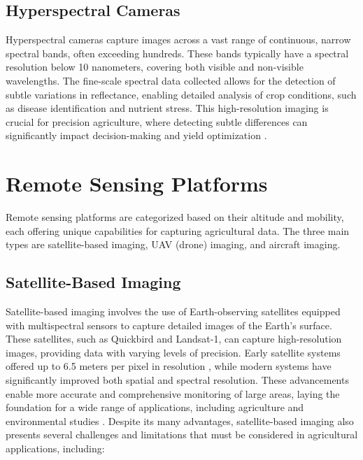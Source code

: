 \subsection{Hyperspectral Cameras}
Hyperspectral cameras capture images across a vast range of continuous, narrow spectral bands, often exceeding hundreds. These bands typically have a spectral resolution below 10 nanometers, covering both visible and non-visible wavelengths. The fine-scale spectral data collected allows for the detection of subtle variations in reflectance, enabling detailed analysis of crop conditions, such as disease identification and nutrient stress. This high-resolution imaging is crucial for precision agriculture, where detecting subtle differences can significantly impact decision-making and yield optimization \parencite{delavarpour2021technical} \parencite{lu2020recent}.

\section{Remote Sensing Platforms}
Remote sensing platforms are categorized based on their altitude and mobility, each offering unique capabilities for capturing agricultural data. The three main types are satellite-based imaging, UAV (drone) imaging, and aircraft imaging.

\subsection{Satellite-Based Imaging}
Satellite-based imaging involves the use of Earth-observing satellites equipped with multispectral sensors to capture detailed images of the Earth's surface. These satellites, such as Quickbird and Landsat-1, can capture high-resolution images, providing data with varying levels of precision. Early satellite systems offered up to 6.5 meters per pixel in resolution \parencite{phang2023satellite}, while modern systems have significantly improved both spatial and spectral resolution. These advancements enable more accurate and comprehensive monitoring of large areas, laying the foundation for a wide range of applications, including agriculture and environmental studies \parencite{adao2017hyperspectral}. Despite its many advantages, satellite-based imaging also presents several challenges and limitations that must be considered in agricultural applications, including:

